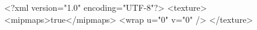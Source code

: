 <?xml version="1.0" encoding="UTF-8"?>
<texture>
    <mipmaps>true</mipmaps>
    <wrap u="0" v="0" />
</texture>